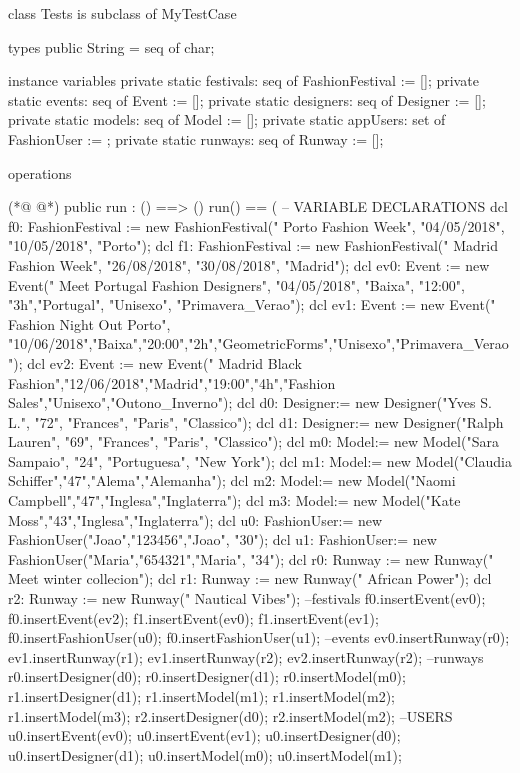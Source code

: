 \begin{vdmpp}[breaklines=true]
class Tests is subclass of MyTestCase

types
public String = seq of char;

instance variables
 private static festivals: seq of FashionFestival := [];
 private static events: seq of Event := [];
 private static designers: seq of Designer := [];
 private static models: seq of Model := [];
 private static appUsers: set of FashionUser := {};
  private static runways: seq of Runway := [];
 
 
operations

(*@
\label{run:17}
@*)
  public run : () ==> ()
  run() ==
  (
    -- VARIABLE DECLARATIONS
   dcl f0: FashionFestival := new FashionFestival(" Porto Fashion Week", "04/05/2018", "10/05/2018", "Porto");
   dcl f1: FashionFestival := new FashionFestival(" Madrid Fashion Week", "26/08/2018", "30/08/2018", "Madrid");
   dcl ev0: Event := new Event(" Meet Portugal Fashion Designers", "04/05/2018", "Baixa", "12:00", "3h","Portugal", "Unisexo", "Primavera_Verao");  
    dcl ev1: Event := new Event(" Fashion Night Out Porto", "10/06/2018","Baixa","20:00","2h","GeometricForms","Unisexo","Primavera_Verao");
   dcl ev2: Event := new Event(" Madrid Black Fashion","12/06/2018","Madrid","19:00","4h","Fashion Sales","Unisexo","Outono_Inverno");         
    dcl d0: Designer:= new Designer("Yves S. L.", "72", "Frances", "Paris", "Classico");
    dcl d1: Designer:= new Designer("Ralph Lauren", "69", "Frances", "Paris", "Classico");
    dcl m0: Model:= new Model("Sara Sampaio", "24", "Portuguesa", "New York");             
    dcl m1: Model:= new Model("Claudia Schiffer","47","Alema","Alemanha");
   dcl m2: Model:= new Model("Naomi Campbell","47","Inglesa","Inglaterra");
   dcl m3: Model:= new Model("Kate Moss","43","Inglesa","Inglaterra");
   dcl u0: FashionUser:= new FashionUser("Joao","123456","Joao", "30");
   dcl u1: FashionUser:= new FashionUser("Maria","654321","Maria", "34");
   dcl r0: Runway := new Runway(" Meet winter collecion");
   dcl r1: Runway := new Runway(" African Power");
   dcl r2: Runway := new Runway(" Nautical Vibes");
  --festivals
   f0.insertEvent(ev0);
    f0.insertEvent(ev2);
    f1.insertEvent(ev0);
    f1.insertEvent(ev1);
    f0.insertFashionUser(u0);
    f0.insertFashionUser(u1);
  --events
  ev0.insertRunway(r0);
   ev1.insertRunway(r1);
   ev1.insertRunway(r2);
   ev2.insertRunway(r2);
  --runways
   r0.insertDesigner(d0);
   r0.insertDesigner(d1);
   r0.insertModel(m0);
   r1.insertDesigner(d1);
   r1.insertModel(m1);
   r1.insertModel(m2);
   r1.insertModel(m3);
   r2.insertDesigner(d0);
   r2.insertModel(m2);
   --USERS
   u0.insertEvent(ev0);
   u0.insertEvent(ev1);
   u0.insertDesigner(d0);
    u0.insertDesigner(d1);
    u0.insertModel(m0);
   u0.insertModel(m1); 
    

\end{vdmpp}
